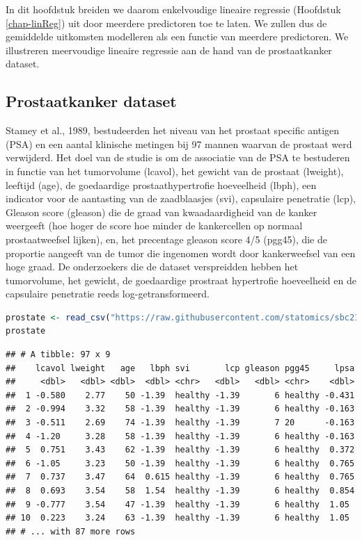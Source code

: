 \documentclass[
  12pt,dutch,coursenotes]{book}
\theoremstyle{definition}
\theoremstyle{definition}
\theoremstyle{definition}
\theoremstyle{definition}
\theoremstyle{remark}
\begin{document}
In dit hoofdstuk breiden we daarom enkelvoudige lineaire regressie (Hoofdstuk \ref{chap-linReg}) uit door meerdere predictoren toe te laten. We zullen dus de gemiddelde uitkomsten modelleren als een functie van meerdere predictoren.
We illustreren meervoudige lineaire regressie aan de hand van de prostaatkanker dataset.

\hypertarget{sec:prostate}{%
\subsection{Prostaatkanker dataset}\label{sec:prostate}}

Stamey et al., 1989, bestudeerden het niveau van het prostaat specific antigen (PSA) en een aantal klinische metingen bij 97 mannen waarvan de prostaat werd verwijderd.
Het doel van de studie is om de associatie van de PSA te bestuderen in functie van het tumorvolume (lcavol), het gewicht van de prostaat (lweight), leeftijd (age), de goedaardige prostaathypertrofie hoeveelheid (lbph), een indicator voor de aantasting van de zaadblaasjes (svi), capsulaire penetratie (lcp), Gleason score (gleason) die de graad van kwaadaardigheid van de kanker weergeeft (hoe hoger de score hoe minder de kankercellen op normaal prostaatweefsel lijken), en, het precentage gleason score 4/5 (pgg45), die de proportie aangeeft van de tumor die ingenomen wordt door kankerweefsel van een hoge graad. De onderzoekers die de dataset verspreidden hebben het tumorvolume, het gewicht, de goedaardige prostraat hypertrofie hoeveelheid en de capsulaire penetratie reeds log-getransformeerd.

\begin{lstlisting}[language=R]
prostate <- read_csv("https://raw.githubusercontent.com/statomics/sbc21/master/data/prostate.csv")
prostate
\end{lstlisting}

\begin{lstlisting}
## # A tibble: 97 x 9
##    lcavol lweight   age   lbph svi       lcp gleason pgg45     lpsa
##     <dbl>   <dbl> <dbl>  <dbl> <chr>   <dbl>   <dbl> <chr>    <dbl>
##  1 -0.580    2.77    50 -1.39  healthy -1.39       6 healthy -0.431
##  2 -0.994    3.32    58 -1.39  healthy -1.39       6 healthy -0.163
##  3 -0.511    2.69    74 -1.39  healthy -1.39       7 20      -0.163
##  4 -1.20     3.28    58 -1.39  healthy -1.39       6 healthy -0.163
##  5  0.751    3.43    62 -1.39  healthy -1.39       6 healthy  0.372
##  6 -1.05     3.23    50 -1.39  healthy -1.39       6 healthy  0.765
##  7  0.737    3.47    64  0.615 healthy -1.39       6 healthy  0.765
##  8  0.693    3.54    58  1.54  healthy -1.39       6 healthy  0.854
##  9 -0.777    3.54    47 -1.39  healthy -1.39       6 healthy  1.05 
## 10  0.223    3.24    63 -1.39  healthy -1.39       6 healthy  1.05 
## # ... with 87 more rows
\end{lstlisting}
\end{document}
